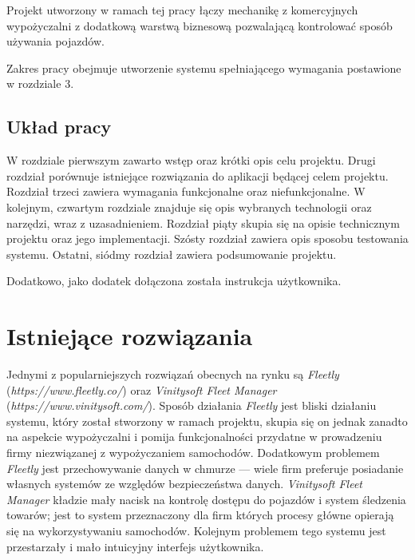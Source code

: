 \documentclass[eng,printmode,openany]{mgr}
\begin{document}
	Projekt utworzony w ramach tej pracy łączy mechanikę z komercyjnych wypożyczalni z dodatkową warstwą biznesową pozwalającą kontrolować sposób używania pojazdów.
	
	Zakres pracy obejmuje utworzenie systemu spełniającego wymagania postawione w rozdziale 3.
	
	\section{Układ pracy}
	W rozdziale pierwszym zawarto wstęp oraz krótki opis celu projektu. Drugi rozdział porównuje istniejące rozwiązania do aplikacji będącej celem projektu. Rozdział trzeci zawiera wymagania funkcjonalne oraz niefunkcjonalne. W kolejnym, czwartym rozdziale znajduje się opis wybranych technologii oraz narzędzi, wraz z uzasadnieniem. Rozdział piąty skupia się na opisie technicznym projektu oraz jego implementacji. Szósty rozdział zawiera opis sposobu testowania systemu. Ostatni, siódmy rozdział zawiera podsumowanie projektu.
	
	Dodatkowo, jako dodatek dołączona została instrukcja użytkownika.
	
	\newpage
	\chapter{Istniejące rozwiązania}
	Jednymi z popularniejszych rozwiązań obecnych na rynku są \textit{Fleetly} (\textit{https://www.fleetly.co/}) oraz \textit{Vinitysoft Fleet Manager} (\textit{https://www.vinitysoft.com/}). Sposób działania \textit{Fleetly} jest bliski działaniu systemu, który został stworzony w ramach projektu, skupia się on jednak zanadto na aspekcie wypożyczalni i pomija funkcjonalności przydatne w prowadzeniu firmy niezwiązanej z wypożyczaniem samochodów. Dodatkowym problemem \textit{Fleetly} jest przechowywanie danych w chmurze — wiele firm preferuje posiadanie własnych systemów ze względów bezpieczeństwa danych. \textit{Vinitysoft Fleet Manager} kładzie mały nacisk na kontrolę dostępu do pojazdów i system śledzenia towarów; jest to system przeznaczony dla firm których procesy główne opierają się na wykorzystywaniu samochodów. Kolejnym problemem tego systemu jest przestarzały i mało intuicyjny interfejs użytkownika.
	
\end{document}
